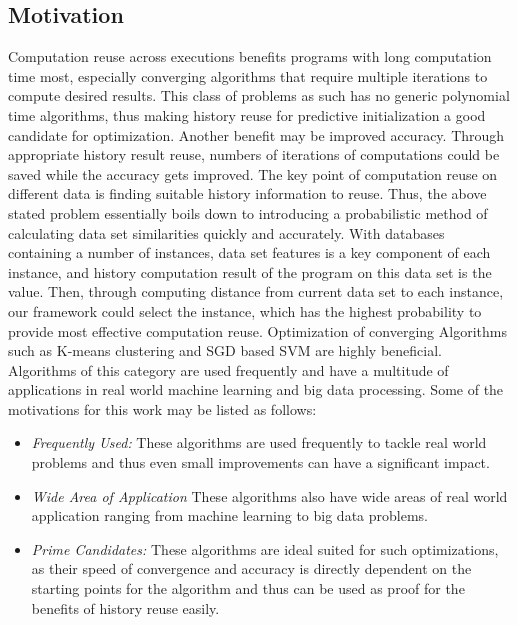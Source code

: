 \documentclass{vldb}
\begin{document}
\subsection{Motivation}
Computation reuse across executions benefits programs with long computation time most, especially converging algorithms that require multiple iterations to compute desired results. This class of problems as such has no generic polynomial time algorithms, thus making history reuse for predictive initialization a good candidate for optimization. Another benefit may be improved accuracy. Through appropriate history result reuse, numbers of iterations of computations could be saved while the accuracy gets improved. The key point of computation reuse on different data is finding suitable history information to reuse. Thus, the above stated problem essentially boils down to introducing a probabilistic method of calculating data set similarities quickly and accurately. With databases containing a number of instances, data set features is a key component of each instance, and history computation result of the program on this data set is the value. Then, through computing distance from current data set to each instance, our framework could select the instance, which has the highest probability to provide most effective computation reuse.
Optimization of converging Algorithms such as K-means clustering and SGD based SVM are highly beneficial. Algorithms of this category are used frequently and have a multitude of applications in real world machine learning and big data processing.  Some of the motivations for this work may be listed as follows:
\begin{itemize}
	\item \textit{Frequently Used:} These algorithms are used frequently to tackle real world problems and thus even small improvements can have a significant impact.
	\item \textit{Wide Area of Application} These algorithms also have wide areas of real world application ranging from machine learning to big data problems.
	\item \textit{Prime Candidates:} These algorithms are ideal suited for such optimizations, as their speed of convergence and accuracy is directly dependent on the starting points for the algorithm and thus can be used as proof for the benefits of history reuse easily.
\end{itemize}
\end{document}
